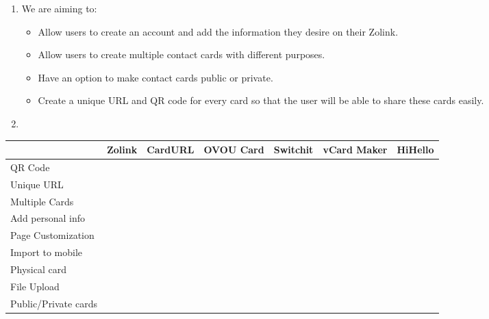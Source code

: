 \documentclass[12pt]{article}%
\begin{document}
\begin{enumerate}
\begin{enumerate}
            \item We are aiming to:
            \begin{itemize}
            	\item Allow users to create an account and add the information they desire on their Zolink.
            	\item Allow users to create multiple contact cards with different purposes.
            	\item Have an option to make contact cards public or private.
            	\item Create a unique URL and QR code for every card so that the user will be able to share these cards easily.
            \end{itemize}
            \item
        \end{enumerate}
\end{enumerate}

\begin{center}
    \begin{tabular}{|l|l|l|l|l|l|l|}
        \hline
         & Zolink & CardURL & OVOU Card & Switchit & vCard Maker & HiHello \\
         \hline
        QR Code & & & & & & \\
        \hline
        Unique URL & & & & & & \\
        \hline
        Multiple Cards & & & & & & \\
        \hline
        Add personal info & & & & & & \\
        \hline
        Page Customization & & & & & & \\
        \hline
        Import to mobile & & & & & & \\
        \hline
        Physical card & & & & & & \\
        \hline
        File Upload & & & & & & \\
        \hline
        Public/Private cards & & & & & & \\
        \hline
    \end{tabular}
\end{center}

\end{document}
